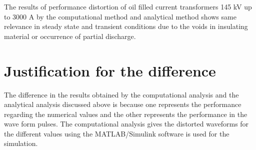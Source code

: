 The results of performance distortion of oil filled current transformers 145 kV up to 3000 A by the computational method and analytical method shows same relevance in steady state and transient conditions due to the voids in insulating material or occurrence of partial discharge.  
\clearpage

\section{Justification for the difference}
The difference in the results obtained by the computational analysis and the analytical analysis discussed above is because one represents the performance regarding the numerical values and the other represents the performance in the wave form pulses. The computational analysis gives the distorted waveforms for the different values using the MATLAB/Simulink software is used for the simulation\setlength{\parskip}{0em}.
